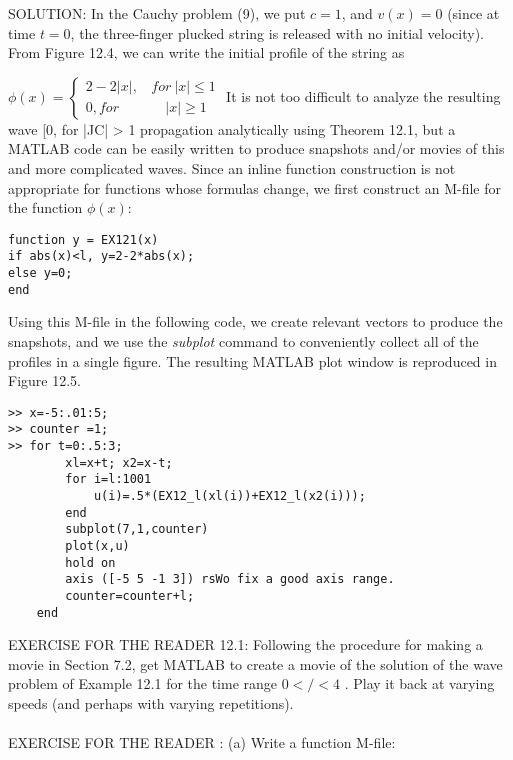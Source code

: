 \documentclass[../main.tex]{subfiles}
\begin{document}
SOLUTION: In the Cauchy problem (9), we put $c = 1$, and $v(x) = 0$ (since at
time $t = 0$, the three-finger plucked string is released with no initial velocity).
From Figure 12.4, we can write the initial profile of the string as

$\phi(x)=
\begin{cases} 2-2\vert x\vert,  ~~~~for~ \vert x\vert \leqslant 1\\
0, for  ~~~~~~~~~~~~~~~\vert x\vert\geqslant 1
\end{cases}$
It is not too difficult to analyze the resulting wave
[0, for |JC| > 1
propagation analytically using Theorem 12.1, but a MATLAB code can be easily
written to produce snapshots and/or movies of this and more complicated waves.
Since an inline function construction is not appropriate for functions whose
formulas change, we first construct an M-file for the function $\phi(x):$

\begin{verbatim}
function y = EX121(x)
if abs(x)<l, y=2-2*abs(x);
else y=0;
end
\end{verbatim}
Using this M-file in the following code, we create relevant vectors to produce the
snapshots, and we use the \textit{subplot} command to conveniently collect all of the
profiles in a single figure. The resulting MATLAB plot window is reproduced in
Figure 12.5. 

\begin{lstlisting}
>> x=-5:.01:5;
>> counter =1;
>> for t=0:.5:3;
		xl=x+t; x2=x-t;
		for i=l:1001
			u(i)=.5*(EX12_l(xl(i))+EX12_l(x2(i)));
		end
		subplot(7,1,counter)
		plot(x,u)
		hold on
		axis ([-5 5 -1 3]) rsWo fix a good axis range.
		counter=counter+l;
	end 
\end{lstlisting}

EXERCISE FOR THE READER 12.1: Following the procedure for making a
movie in Section 7.2, get MATLAB to create a movie of the solution of the wave
problem of Example 12.1 for the time range $0</<4$ . Play it back at varying
speeds (and perhaps with varying repetitions).\\
\\
EXERCISE FOR THE READER : (a) Write a function M-file:
\end{document}

